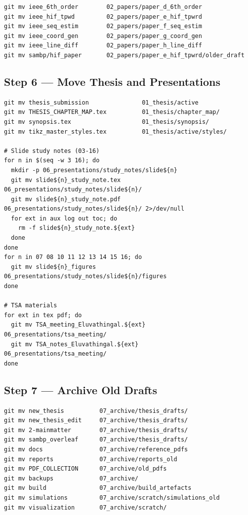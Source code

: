 \documentclass[11pt,a4paper]{article}
\begin{document}
\begin{verbatim}
git mv ieee_6th_order        02_papers/paper_d_6th_order
git mv ieee_hif_tpwd         02_papers/paper_e_hif_tpwrd
git mv ieee_seq_estim        02_papers/paper_f_seq_estim
git mv ieee_coord_gen        02_papers/paper_g_coord_gen
git mv ieee_line_diff        02_papers/paper_h_line_diff
git mv sambp/hif_paper       02_papers/paper_e_hif_tpwrd/older_draft
\end{verbatim}

\subsection{Step 6 — Move Thesis and Presentations}

\begin{verbatim}
git mv thesis_submission               01_thesis/active
git mv THESIS_CHAPTER_MAP.tex          01_thesis/chapter_map/
git mv synopsis.tex                    01_thesis/synopsis/
git mv tikz_master_styles.tex          01_thesis/active/styles/

# Slide study notes (03-16)
for n in $(seq -w 3 16); do
  mkdir -p 06_presentations/study_notes/slide${n}
  git mv slide${n}_study_note.tex  06_presentations/study_notes/slide${n}/
  git mv slide${n}_study_note.pdf  06_presentations/study_notes/slide${n}/ 2>/dev/null
  for ext in aux log out toc; do
    rm -f slide${n}_study_note.${ext}
  done
done
for n in 07 08 10 11 12 13 14 15 16; do
  git mv slide${n}_figures 06_presentations/study_notes/slide${n}/figures
done

# TSA materials
for ext in tex pdf; do
  git mv TSA_meeting_Eluvathingal.${ext}  06_presentations/tsa_meeting/
  git mv TSA_notes_Eluvathingal.${ext}    06_presentations/tsa_meeting/
done
\end{verbatim}

\subsection{Step 7 — Archive Old Drafts}

\begin{verbatim}
git mv new_thesis          07_archive/thesis_drafts/
git mv new_thesis_edit     07_archive/thesis_drafts/
git mv 2-mainmatter        07_archive/thesis_drafts/
git mv sambp_overleaf      07_archive/thesis_drafts/
git mv docs                07_archive/reference_pdfs
git mv reports             07_archive/reports_old
git mv PDF_COLLECTION      07_archive/old_pdfs
git mv backups             07_archive/
git mv build               07_archive/build_artefacts
git mv simulations         07_archive/scratch/simulations_old
git mv visualization       07_archive/scratch/
\end{verbatim}
\end{document}
